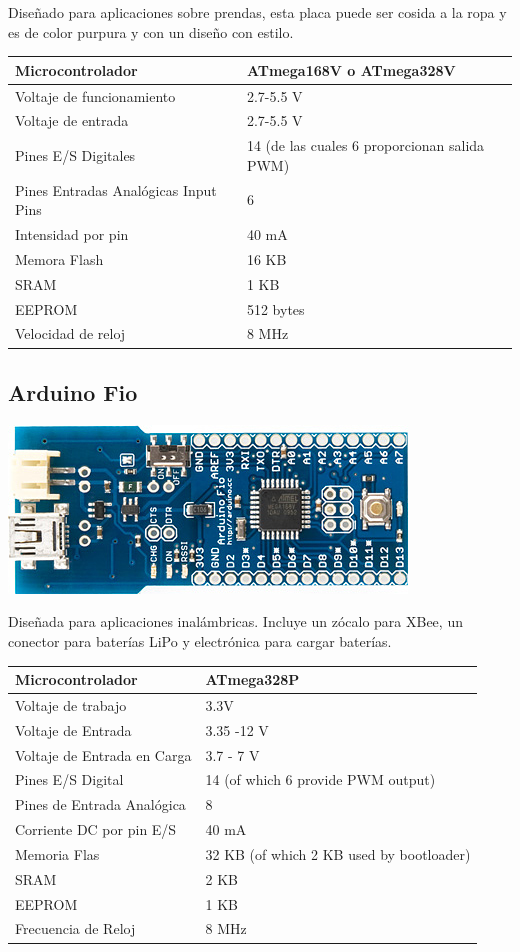 \documentclass[12pt,a4paper]{report}
\begin{document}
Diseñado para aplicaciones sobre prendas, esta placa puede ser cosida a la ropa y es de color purpura y con un diseño con estilo. 

\begin{tabular}{||l | l ||}
\hline
\hline
Microcontrolador & ATmega168V o ATmega328V\\
\hline
Voltaje de funcionamiento & 2.7-5.5 V\\
\hline
Voltaje de entrada & 2.7-5.5 V\\
\hline
Pines E/S Digitales & 14 (de las cuales 6 proporcionan salida PWM)\\
\hline
Pines Entradas Analógicas Input Pins & 6\\
\hline
Intensidad por pin & 40 mA\\
\hline
Memora Flash & 16 KB \\
\hline
SRAM & 1 KB\\
\hline
EEPROM & 512 bytes\\
\hline
Velocidad de reloj & 8 MHz\\
\hline
\hline
\end{tabular}


\subsection{Arduino Fio}

\includegraphics[scale=0.6]{ArduinoFio.jpg}

Diseñada para aplicaciones inalámbricas. Incluye un zócalo para XBee, un conector para baterías LiPo y electrónica para cargar baterías. 

\begin{tabular}{||l | l ||}
\hline
\hline
Microcontrolador & ATmega328P\\
\hline
Voltaje de trabajo & 3.3V\\
\hline
Voltaje de Entrada & 3.35 -12 V\\
\hline
Voltaje de Entrada en Carga & 3.7 - 7 V\\
\hline
Pines E/S Digital & 14 (of which 6 provide PWM output)\\
\hline
Pines de Entrada Analógica & 8\\
\hline
Corriente DC por pin E/S & 40 mA\\
\hline
Memoria Flas & 	32 KB (of which 2 KB used by bootloader)\\
\hline
SRAM & 2 KB\\
\hline
EEPROM & 1 KB\\
\hline
Frecuencia de Reloj & 8 MHz\\
\hline
\hline
\end{tabular}
\end{document}
